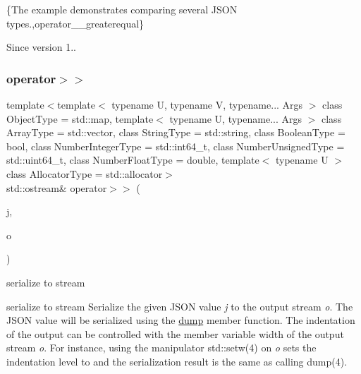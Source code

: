 \{The example demonstrates comparing several J\+S\+ON types.,operator\+\_\+\+\_\+greaterequal\}

\begin{DoxySince}{Since}
version 1.. 
\end{DoxySince}
\hypertarget{classnlohmann_1_1basic__json_a34d6a60dd99e9f33b8273a1c8db5669b}{}\label{classnlohmann_1_1basic__json_a34d6a60dd99e9f33b8273a1c8db5669b} 
\subsubsection{\texorpdfstring{operator$>$$>$}{operator>>}\hspace{0.1cm}{\footnotesize\ttfamily [1/2]}}
{\footnotesize\ttfamily template$<$template$<$ typename U, typename V, typename... Args $>$ class Object\+Type = std\+::map, template$<$ typename U, typename... Args $>$ class Array\+Type = std\+::vector, class String\+Type  = std\+::string, class Boolean\+Type  = bool, class Number\+Integer\+Type  = std\+::int64\+\_\+t, class Number\+Unsigned\+Type  = std\+::uint64\+\_\+t, class Number\+Float\+Type  = double, template$<$ typename U $>$ class Allocator\+Type = std\+::allocator$>$ \\
std\+::ostream\& operator$>$$>$ (\begin{DoxyParamCaption}\item[{const \hyperlink{classnlohmann_1_1basic__json}{basic\+\_\+json}$<$ Object\+Type, Array\+Type, String\+Type, Boolean\+Type, Number\+Integer\+Type, Number\+Unsigned\+Type, Number\+Float\+Type, Allocator\+Type $>$ \&}]{j,  }\item[{std\+::ostream \&}]{o }\end{DoxyParamCaption})\hspace{0.3cm}{\ttfamily [friend]}}



serialize to stream 

serialize to stream Serialize the given J\+S\+ON value {\itshape j} to the output stream {\itshape o}. The J\+S\+ON value will be serialized using the \hyperlink{classnlohmann_1_1basic__json_afd4b7d7bcadc62da7c582fa36ba6805f}{dump} member function. The indentation of the output can be controlled with the member variable {\ttfamily width} of the output stream {\itshape o}. For instance, using the manipulator {\ttfamily std\+::setw(4)} on {\itshape o} sets the indentation level to {} and the serialization result is the same as calling {\ttfamily dump(4)}.

